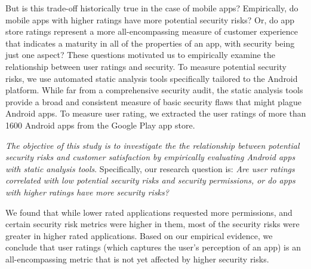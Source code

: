 But is this trade-off historically true in the case of mobile apps? Empirically, do mobile apps with higher ratings have more potential security risks? Or, do app store ratings represent a more all-encompassing measure of customer experience that indicates a maturity in all of the properties of an app, with security being just one aspect? These questions motivated us to empirically examine the relationship between user ratings and security. To measure potential security risks, we use automated static analysis tools specifically tailored to the Android platform. While far from a comprehensive security audit, the static analysis tools provide a broad and consistent measure of basic security flaws that might plague Android apps. To measure user rating, we extracted the user ratings of more than 1600 Android apps from the Google Play app store. 





\emph{The objective of this study is to investigate the the relationship between potential security risks and customer satisfaction by empirically evaluating Android apps with static analysis tools}. Specifically, our research question is: \textit{Are user ratings correlated with low potential security risks and security permissions, or do apps with higher ratings have more security risks?}

We found that while lower rated applications requested more permissions, and certain security risk metrics were higher in them, most of the security risks were greater in higher rated applications. Based on our empirical evidence, we conclude that user ratings (which captures the user's perception of an app) is an all-encompassing metric that is not yet affected by higher security risks. 

